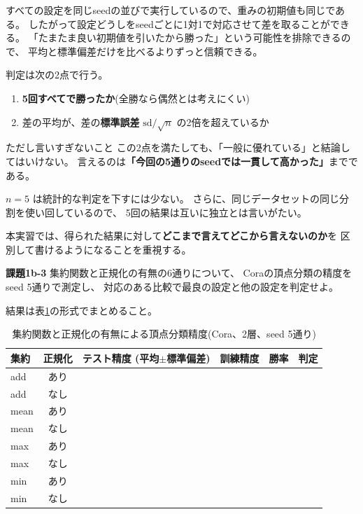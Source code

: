 \documentclass[11pt,a4paper]{jsarticle}
\begin{document}
すべての設定を同じseedの並びで実行しているので、重みの初期値も同じである。
したがって設定どうしをseedごとに1対1で対応させて差を取ることができる。
「たまたま良い初期値を引いたから勝った」という可能性を排除できるので、
平均と標準偏差だけを比べるよりずっと信頼できる。

判定は次の2点で行う。

\begin{enumerate}
\item \textbf{5回すべてで勝ったか}(全勝なら偶然とは考えにくい)
\item 差の平均が、差の\textbf{標準誤差} $\mathrm{sd}/\sqrt{n}$ の2倍を超えているか
\end{enumerate}

\begin{itembox}[l]{ただし言いすぎないこと}
この2点を満たしても、「一般に優れている」と結論してはいけない。
言えるのは\textbf{「今回の5通りのseedでは一貫して高かった」}までである。

$n=5$ は統計的な判定を下すには少ない。
さらに、同じデータセットの同じ分割を使い回しているので、
5回の結果は互いに独立とは言いがたい。

本実習では、得られた結果に対して\textbf{どこまで言えてどこから言えないのか}を
区別して書けるようになることを重視する。
\end{itembox}

\begin{screen}
\textbf{課題1b-3} \quad 集約関数と正規化の有無の6通りについて、
Coraの頂点分類の精度をseed 5通りで測定し、
対応のある比較で最良の設定と他の設定を判定せよ。
\end{screen}

\noindent
結果は表\ref{tab:aggr}の形式でまとめること。

\begin{table}[h]
\caption{集約関数と正規化の有無による頂点分類精度(Cora、2層、seed 5通り)}
\label{tab:aggr}
\begin{center}
\begin{tabular}{|l|c||p{2.4cm}|p{2.0cm}|p{1.6cm}|p{2.0cm}|}
\hline
集約 & 正規化 & テスト精度 (平均$\pm$標準偏差) & 訓練精度 & 勝率 & 判定 \\
\hline\hline
add  & あり & & & & \\
\hline
add  & なし & & & & \\
\hline
mean & あり & & & & \\
\hline
mean & なし & & & & \\
\hline
max  & あり & & & & \\
\hline
max  & なし & & & & \\
\hline
min  & あり & & & & \\
\hline
min  & なし & & & & \\
\hline
\end{tabular}
\end{center}
\end{table}
\end{document}

